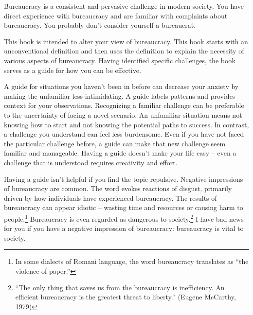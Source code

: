 

Bureaucracy is a consistent and pervasive challenge in modern society. You have direct experience with bureaucracy and are familiar with complaints about bureaucracy. You probably don't consider yourself a bureaucrat.

This book is intended to alter your view of bureaucracy. This book starts with an unconventional definition and then uses the definition to explain the necessity of various aspects of bureaucracy. Having identified specific challenges, the book serves as a guide for how you can be effective. 

A guide for situations you haven't been in before can decrease your anxiety by making the unfamiliar less intimidating. 
A guide labels patterns and provides context for your observations. 
Recognizing a familiar challenge can be preferable to the uncertainty of facing a novel scenario. An unfamiliar situation means not knowing how to start and not knowing the potential paths to success. In contrast, a challenge you understand can feel less burdensome. 
Even if you have not faced the particular challenge before, a guide can make that new challenge seem familiar and manageable. 
Having a guide doesn't make your life easy -- even a challenge that is understood requires creativity and effort.


Having a guide isn't helpful if you find the topic repulsive.
Negative impressions of bureaucracy are common. The word
evokes reactions of disgust, primarily driven by how individuals have experienced bureaucracy.
The results of bureaucracy can appear idiotic -- 
wasting time and resources or causing harm to people.\footnote{In some dialects of Romani language, the word bureaucracy translates as ``the violence of paper.''}
Bureaucracy is even regarded as dangerous to society.\footnote{``The only thing that saves us from the bureaucracy is inefficiency. An efficient bureaucracy is the greatest threat to liberty." (Eugene McCarthy, 1979)}
I have bad news for you if you have a negative impression of bureaucracy: bureaucracy is vital to society. 

